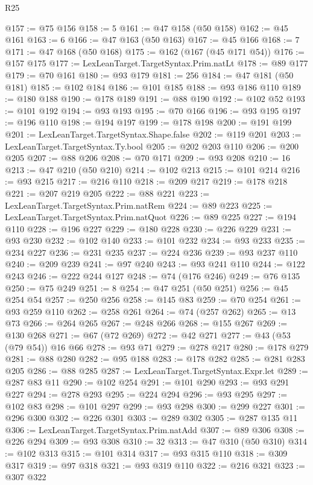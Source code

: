\begin{lexlean}{R25}
\begin{coremodule}
@157 := @75 @156
@158 := 5
@161 := @47 @158 (@50 @158)
@162 := @45 @161
@163 := 6
@166 := @47 @163 (@50 @163)
@167 := @45 @166
@168 := 7
@171 := @47 @168 (@50 @168)
@175 := @162 (@167 (@45 @171 @54))
@176 := @157 @175
@177 := LexLeanTarget.TargetSyntax.Prim.natLt
@178 := @89 @177
@179 := @70 @161
@180 := @93 @179
@181 := 256
@184 := @47 @181 (@50 @181)
@185 := @102 @184
@186 := @101 @185
@188 := @93 @186 @110
@189 := @180 @188
@190 := @178 @189
@191 := @88 @190
@192 := @102 @52
@193 := @101 @192
@194 := @93 @193
@195 := @70 @166
@196 := @93 @195
@197 := @196 @110
@198 := @194 @197
@199 := @178 @198
@200 := @191 @199
@201 := LexLeanTarget.TargetSyntax.Shape.false
@202 := @119 @201
@203 := LexLeanTarget.TargetSyntax.Ty.bool
@205 := @202 @203 @110
@206 := @200 @205
@207 := @88 @206
@208 := @70 @171
@209 := @93 @208
@210 := 16
@213 := @47 @210 (@50 @210)
@214 := @102 @213
@215 := @101 @214
@216 := @93 @215
@217 := @216 @110
@218 := @209 @217
@219 := @178 @218
@221 := @207 @219 @205
@222 := @88 @221
@223 := LexLeanTarget.TargetSyntax.Prim.natRem
@224 := @89 @223
@225 := LexLeanTarget.TargetSyntax.Prim.natQuot
@226 := @89 @225
@227 := @194 @110
@228 := @196 @227
@229 := @180 @228
@230 := @226 @229
@231 := @93 @230
@232 := @102 @140
@233 := @101 @232
@234 := @93 @233
@235 := @234 @227
@236 := @231 @235
@237 := @224 @236
@239 := @93 @237 @110
@240 := @209 @239
@241 := @97 @240
@243 := @93 @241 @110
@244 := @122 @243
@246 := @222 @244 @127
@248 := @74 (@176 @246)
@249 := @76 @135
@250 := @75 @249
@251 := 8
@254 := @47 @251 (@50 @251)
@256 := @45 @254 @54
@257 := @250 @256
@258 := @145 @83
@259 := @70 @254
@261 := @93 @259 @110
@262 := @258 @261
@264 := @74 (@257 @262)
@265 := @13 @73
@266 := @264 @265
@267 := @248 @266
@268 := @155 @267
@269 := @130 @268
@271 := @67 (@72 @269)
@272 := @42 @271
@277 := @43 (@53 (@79 @54)) @16 @66
@278 := @93 @71
@279 := @278 @217
@280 := @178 @279
@281 := @88 @280
@282 := @95 @188
@283 := @178 @282
@285 := @281 @283 @205
@286 := @88 @285
@287 := LexLeanTarget.TargetSyntax.Expr.let
@289 := @287 @83 @11
@290 := @102 @254
@291 := @101 @290
@293 := @93 @291 @227
@294 := @278 @293
@295 := @224 @294
@296 := @93 @295
@297 := @102 @83
@298 := @101 @297
@299 := @93 @298
@300 := @299 @227
@301 := @296 @300
@302 := @226 @301
@303 := @289 @302
@305 := @287 @135 @11
@306 := LexLeanTarget.TargetSyntax.Prim.natAdd
@307 := @89 @306
@308 := @226 @294
@309 := @93 @308
@310 := 32
@313 := @47 @310 (@50 @310)
@314 := @102 @313
@315 := @101 @314
@317 := @93 @315 @110
@318 := @309 @317
@319 := @97 @318
@321 := @93 @319 @110
@322 := @216 @321
@323 := @307 @322

\end{coremodule}
\end{lexlean}
